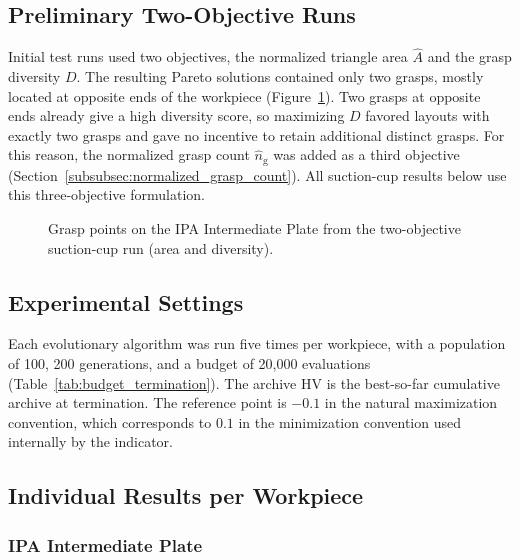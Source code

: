 \subsection{Preliminary Two-Objective Runs}
\label{subsec:results_sc_preliminary}

Initial test runs used two objectives, the normalized triangle area $\hat{A}$ and the
grasp diversity $D$. The resulting Pareto solutions contained only two grasps, mostly
located at opposite ends of the workpiece (Figure~\ref{fig:sc_preliminary_pareto}). Two
grasps at opposite ends already give a high diversity score, so maximizing $D$ favored
layouts with exactly two grasps and gave no incentive to retain additional distinct
grasps. For this reason, the normalized grasp count $\hat{n}_{\mathrm{g}}$ was added as a
third objective (Section~\ref{subsubsec:normalized_grasp_count}). All suction-cup results
below use this three-objective formulation.

\begin{figure}[H]
    \centering
    \caption{Grasp points on the IPA Intermediate Plate from the two-objective
    suction-cup run (area and diversity).}
    \label{fig:sc_preliminary_pareto}
\end{figure}

\subsection{Experimental Settings}
\label{subsec:results_sc_settings}

Each evolutionary algorithm was run five times per workpiece, with a population of 100,
200 generations, and a budget of 20,000 evaluations (Table~\ref{tab:budget_termination}).
The archive HV is the best-so-far cumulative archive at termination. The reference point is
$-0.1$ in the natural maximization convention, which corresponds to $0.1$ in the
minimization convention used internally by the indicator.

\subsection{Individual Results per Workpiece}
\label{subsec:results_sc_individual}

\subsubsection{IPA Intermediate Plate}
\label{subsubsec:results_sc_ipa}

